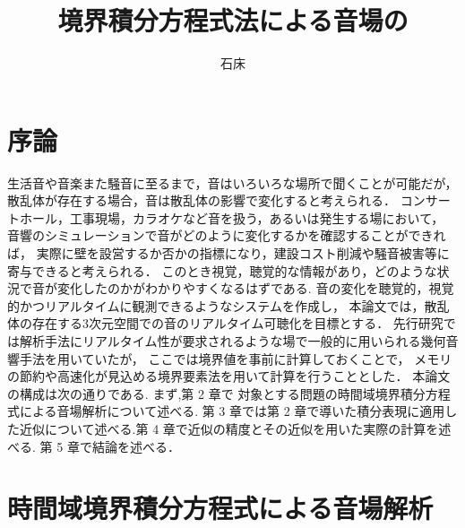\documentclass[dvipdfmx]{ampbt}
\title{境界積分方程式法による音場の}     %
      {数値解析と移動する受音点における}      %
      {リアルタイム可聴化について}                %
\author{石床}{竜一}             %
\begin{document}
\ifoutputbody
\makeinsidecover                %
\makeabstract                   %
\maketoc                        %
\setcounter{page}{1}            %
\section{序論}



生活音や音楽また騒音に至るまで，音はいろいろな場所で聞くことが可能だが，
散乱体が存在する場合，音は散乱体の影響で変化すると考えられる．
コンサートホール，工事現場，カラオケなど音を扱う，あるいは発生する場において，
音響のシミュレーションで音がどのように変化するかを確認することができれば，
実際に壁を設営するか否かの指標になり，建設コスト削減や騒音被害等に寄与できると考えられる．
このとき視覚，聴覚的な情報があり，どのような状況で音が変化したのかがわかりやすくなるはずである.
音の変化を聴覚的，視覚的かつリアルタイムに観測できるようなシステムを作成し，
本論文では，散乱体の存在する3次元空間での音のリアルタイム可聴化を目標とする．
先行研究では解析手法にリアルタイム性が要求されるような場で一般的に用いられる幾何音響手法を用いていたが，
ここでは境界値を事前に計算しておくことで，
メモリの節約や高速化が見込める境界要素法を用いて計算を行うこととした．
本論文の構成は次の通りである.
まず,第 2 章で 対象とする問題の時間域境界積分方程式による音場解析について述べる.
第 3 章では第 2 章で導いた積分表現に適用した近似について述べる.第 4 章で近似の精度とその近似を用いた実際の計算を述べる.
第 5 章で結論を述べる．


\section{時間域境界積分方程式による音場解析}
\label{2章}
\end{document}
